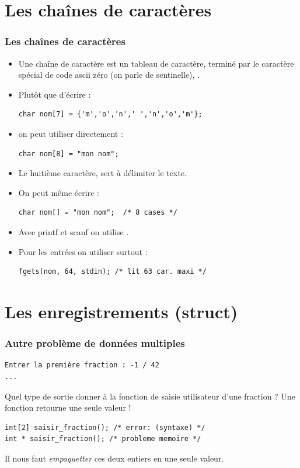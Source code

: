 \documentclass[xcolor=pdftex,svgnames,table]{beamer}
\begin{document}
\section[Chaînes]{Les chaînes de caractères}
\begin{frame}[fragile]
  \frametitle{Les chaînes de caractères}
  \begin{itemize}
    \item Une chaîne de caractère est un tableau de caractère, terminé
      par le caractère spécial de code ascii zéro (on parle de
      sentinelle), \alert{}.
\item Plutôt que d'écrire :
  \begin{lstlisting}
char nom[7] = {'m','o','n',' ','n','o','m'};
  \end{lstlisting}
\item on peut utiliser directement :
  \begin{lstlisting}
char nom[8] = "mon nom";
  \end{lstlisting}
\item Le huitième caractère,  sert à délimiter le
  texte.
\item On peut même écrire :
  \begin{lstlisting}
char nom[] = "mon nom";  /* 8 cases */
  \end{lstlisting}
\item Avec printf et scanf  on utilise .
\item Pour les entrées on utiliser surtout   :
  \begin{lstlisting}
fgets(nom, 64, stdin); /* lit 63 car. maxi */
  \end{lstlisting}
  \end{itemize}
\end{frame}

\section{Les enregistrements (struct)}

\begin{frame}[fragile]
  \frametitle{Autre problème de données multiples}
\begin{verbatim}
Entrer la première fraction : -1 / 42
...
\end{verbatim}
\pause
Quel type de sortie donner à la fonction de saisie utilisateur d'une
fraction ? Une fonction retourne une seule valeur !
\pause
  \begin{lstlisting}
int[2] saisir_fraction(); /* error: (syntaxe) */
int * saisir_fraction(); /* probleme memoire */
  \end{lstlisting}
\pause
 Il nous faut \emph{empaquetter} ces deux entiers en une seule valeur.
\end{frame}
\end{document}
